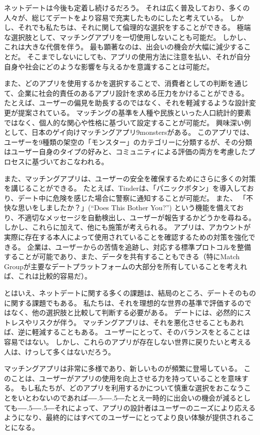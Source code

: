\documentclass[paper=a4,book,openany]{jlreq}
\def\DDASH{―\kern-.5\zw―\kern-.5\zw―} %
\begin{document}
ネットデートは今後も定着し続けるだろう。
それは広く普及しており、多くの人々が、総じてデートをより容易で充実したものにしたと考えている。
しかし、それでも私たちは、それに関して倫理的な選択をすることができる。
極端な選択肢として、マッチングアプリを一切使用しないことも可能だ。
しかし、これは大きな代償を伴う。
最も顕著なのは、出会いの機会が大幅に減少することだ。
そこまでしないにしても、アプリの使用方法に注意を払い、それが自分自身や社会にどのような影響を与えるかを意識することは可能だ。

また、どのアプリを使用するかを選択することで、消費者としての判断を通じて、企業に社会的責任のあるアプリ設計を求める圧力をかけることができる。
たとえば、ユーザーの偏見を助長するのではなく、それを軽減するような設計変更が提案されている。
マッチングの基準を人種や民族といった人口統計的要素ではなく、個人的な関心や性格に基づいて設定することが可能だ。
興味深い例として、日本のゲイ向けマッチングアプリ{9monsters}がある。
このアプリでは、ユーザーを9種類の架空の「モンスター」のカテゴリーに分類するが、その分類はユーザー自身のタイプの好みと、コミュニティによる評価の両方を考慮したプロセスに基づいておこなわれる\citep{miksche17:_meet_gay_app,hutson18:_debias_desir}。

また、マッチングアプリは、ユーザーの安全を確保するためにさらに多くの対策を講じることができる。
たとえば、Tinderは、「パニックボタン」を導入しており、デート中に危険を感じた場合に警察に通知することが可能だ。
また、 「不快な思いをしましたか？」(``Does This Bother You?'') という機能を備えており、不適切なメッセージを自動検出し、ユーザーが報告するかどうかを尋ねる。
しかし、これらに加えて、他にも施策が考えられる。
アプリは、アカウントが実際に存在する本人によって使用されていることを確認するための対策を強化できる。
企業は、ユーザーからの苦情を追跡し、対応する標準プロトコルを整備することが可能であり、また、データを共有することもできる（特にMatch Groupが主要なデートプラットフォームの大部分を所有していることを考えれば、これは比較的容易だ）。

とはいえ、ネットデートに関する多くの課題は、結局のところ、デートそのものに関する課題でもある。
私たちは、それを理想的な世界の基準で評価するのではなく、他の選択肢と比較して判断する必要がある。
デートには、必然的にストレスやリスクが伴う。
マッチングアプリは、それを悪化させることもあれば、逆に軽減することもある。
ユーザーにとって、そのバランスをとることは容易ではない。
しかし、これらのアプリが存在しない世界に戻りたいと考える人は、けっして多くはないだろう。

マッチングアプリは非常に多様であり、新しいものが頻繁に登場している。
このことは、ユーザーがアプリの使用を向上させる力を持っていることを意味する。
もし私たちが、どのアプリを利用するかについて慎重な選択をおこなうことをいとわないのであれば{\DDASH}たとえ一時的に出会いの機会が減るとしても{\DDASH}それによって、アプリの設計者はユーザーのニーズにより応えるようになり、最終的にはすべてのユーザーにとってより良い体験が提供されることになる。
\end{document}
